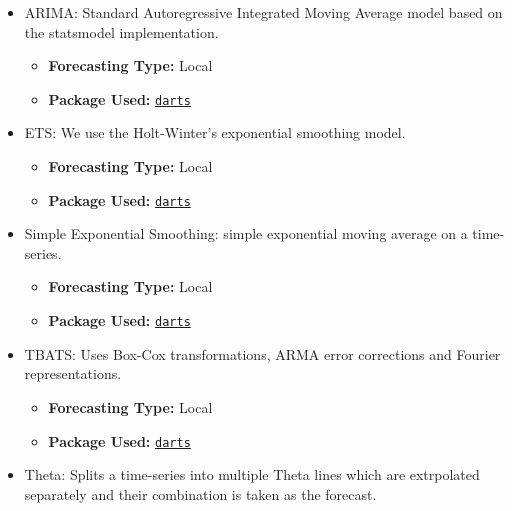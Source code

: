 \documentclass{article}
\begin{document}
\begin{itemize}
    \item ARIMA: Standard Autoregressive Integrated Moving Average model based on the statsmodel implementation.\cite{Box2013}
    \begin{itemize}
        \item \textbf{Forecasting Type: }Local
        \item \textbf{Package Used: }\texttt{\href{https://unit8co.github.io/darts/generated_api/darts.models.forecasting.arima.html}{darts}}
    \end{itemize}
    \item ETS: We use the Holt-Winter's exponential smoothing model\cite{Winters1960}. %
    \begin{itemize}
        \item \textbf{Forecasting Type: }Local
        \item \textbf{Package Used: }\texttt{\href{https://unit8co.github.io/darts/generated_api/darts.models.forecasting.exponential_smoothing.html}{darts}}
    \end{itemize}
    \item Simple Exponential Smoothing: simple exponential moving average on a time-series\cite{Brown2004}.
    \begin{itemize}
        \item \textbf{Forecasting Type: }Local
        \item \textbf{Package Used: }\texttt{\href{https://unit8co.github.io/darts/generated_api/darts.models.forecasting.exponential_smoothing.html}{darts}}
    \end{itemize}
    \item TBATS: Uses Box-Cox transformations, ARMA error corrections and Fourier representations\cite{DeLivera2011}.
    \begin{itemize}
        \item \textbf{Forecasting Type: }Local
        \item \textbf{Package Used: }\texttt{\href{https://unit8co.github.io/darts/generated_api/darts.models.forecasting.sf_tbats.html}{darts}}
    \end{itemize}
    \item Theta: Splits a time-series into multiple Theta lines which are extrpolated separately and their combination is taken as the forecast\cite{Assimakopoulos2000}.
    \begin{itemize}

\end{itemize}
\end{itemize}
\end{document}
